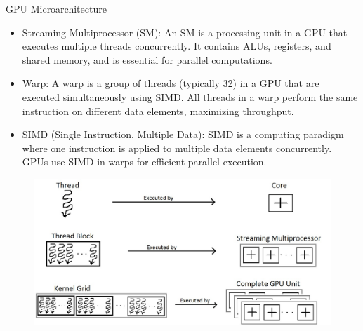 \begin{frame}{GPU Microarchitecture}
    \begin{block}{}
        \begin{itemize}
            \item Streaming Multiprocessor (SM): An SM is a processing unit in a GPU that executes multiple threads concurrently. 
            It contains ALUs, registers, and shared memory, and is essential for parallel computations.
            \item Warp: A warp is a group of threads (typically 32) in a GPU that are executed simultaneously using SIMD. 
            All threads in a warp perform the same instruction on different data elements, maximizing throughput.
            \item SIMD (Single Instruction, Multiple Data): SIMD is a computing paradigm where one instruction is applied to multiple data elements concurrently. 
            GPUs use SIMD in warps for efficient parallel execution.
        \end{itemize}
        \begin{center}
            \begin{figure}[H]
                \includegraphics[scale=0.35]{figures/Software-Perspective_for_thread_block.jpg}
            \end{figure}
        \end{center}
    \end{block}
\end{frame}

